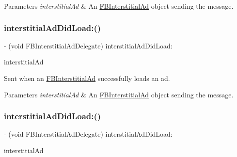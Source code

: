 \begin{DoxyParams}{Parameters}
{\em interstitial\+Ad} & An \hyperlink{interfaceFBInterstitialAd}{F\+B\+Interstitial\+Ad} object sending the message. \\
\hline
\end{DoxyParams}
\mbox{\label{protocolFBInterstitialAdDelegate_01-p_a6e42af81b5d6382056651aee8b71c720}} 
\subsubsection{\texorpdfstring{interstitial\+Ad\+Did\+Load\+:()}{interstitialAdDidLoad:()}\hspace{0.1cm}{\footnotesize\ttfamily [3/5]}}
{\footnotesize\ttfamily -\/ (void F\+B\+Interstitial\+Ad\+Delegate) interstitial\+Ad\+Did\+Load\+: \begin{DoxyParamCaption}\item[{(\hyperlink{interfaceFBInterstitialAd}{F\+B\+Interstitial\+Ad} $\ast$)}]{interstitial\+Ad }\end{DoxyParamCaption}\hspace{0.3cm}{\ttfamily [optional]}}

Sent when an \hyperlink{interfaceFBInterstitialAd}{F\+B\+Interstitial\+Ad} successfully loads an ad.


\begin{DoxyParams}{Parameters}
{\em interstitial\+Ad} & An \hyperlink{interfaceFBInterstitialAd}{F\+B\+Interstitial\+Ad} object sending the message. \\
\hline
\end{DoxyParams}
\mbox{\label{protocolFBInterstitialAdDelegate_01-p_a6e42af81b5d6382056651aee8b71c720}} 
\subsubsection{\texorpdfstring{interstitial\+Ad\+Did\+Load\+:()}{interstitialAdDidLoad:()}\hspace{0.1cm}{\footnotesize\ttfamily [4/5]}}
{\footnotesize\ttfamily -\/ (void F\+B\+Interstitial\+Ad\+Delegate) interstitial\+Ad\+Did\+Load\+: \begin{DoxyParamCaption}\item[{(\hyperlink{interfaceFBInterstitialAd}{F\+B\+Interstitial\+Ad} $\ast$)}]{interstitial\+Ad }\end{DoxyParamCaption}\hspace{0.3cm}{\ttfamily [optional]}}

